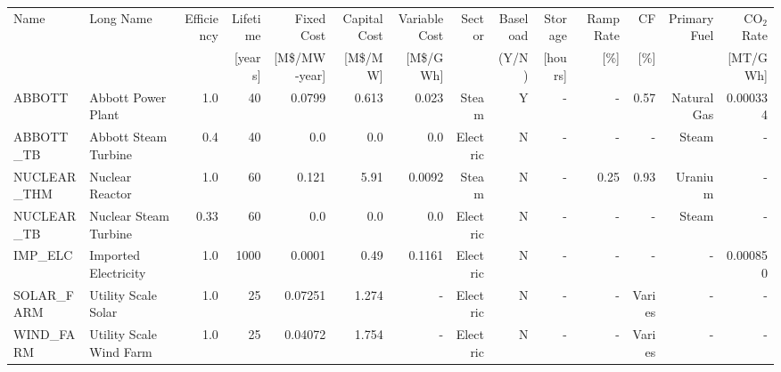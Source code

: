 \begin{tabular}{llrrrrrrrrrrrr}
\toprule
        Name &                   Long Name & Efficiency &  Lifetime & Fixed Cost & Capital Cost & Variable Cost &        Sector & Baseload & Storage & Ramp Rate & CF& Primary Fuel &  CO$_2$ Rate \\
        &  & & [years] & [M\$/MW-year] & [M\$/MW] & [M\$/GWh] & & (Y/N) & [hours] & [\%] & [\%] &  & [MT/GWh] \\
\midrule
      ABBOTT &          Abbott Power Plant &       1.0 &        40 &                  0.0799 &                   0.613 &                  0.023 &         Steam &               Y &                      - &       - &                0.57 &  Natural Gas &                     0.000334 \\
   ABBOTT\_TB &        Abbott Steam Turbine &        0.4 &        40 &                     0.0 &                     0.0 &                    0.0 &      Electric &               N &                      - &       - &                 - &        Steam &                     - \\
 NUCLEAR\_THM &             Nuclear Reactor &       1.0 &        60 &                   0.121 &                    5.91 &                 0.0092 &         Steam &               N &                      - &      0.25 &                0.93 &      Uranium &                     - \\
  NUCLEAR\_TB &       Nuclear Steam Turbine &       0.33 &        60 &                     0.0 &                     0.0 &                    0.0 &      Electric &               N &                      - &       - &                 - &        Steam &                     - \\
     IMP\_ELC &        Imported Electricity &        1.0 &      1000 &                  0.0001 &                    0.49 &                 0.1161 &      Electric &               N &                      - &       - &                 - &          - &                     0.000850 \\
  SOLAR\_FARM &         Utility Scale Solar &        1.0 &        25 &                 0.07251 &                   1.274 &                    - &      Electric &               N &                      - &       - &              Varies &          - &                     - \\
   WIND\_FARM &     Utility Scale Wind Farm &        1.0 &        25 &                 0.04072 &                   1.754 &                    - &      Electric &               N &                      - &       - &              Varies &          - &                     - \\

\end{tabular}
